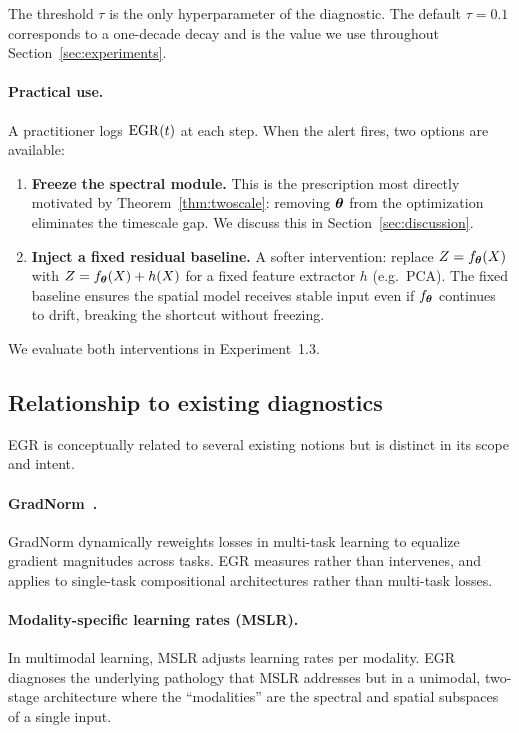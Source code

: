 \begin{remark}
The threshold $\tau$ is the only hyperparameter of the diagnostic.
The default $\tau = 0.1$ corresponds to a one-decade decay and is the
value we use throughout Section~\ref{sec:experiments}.
\end{remark}

\paragraph{Practical use.}
A practitioner logs $\mathrm{EGR}(t)$ at each step. When the alert fires,
two options are available:
\begin{enumerate}
    \item \textbf{Freeze the spectral module.} This is the prescription
          most directly motivated by Theorem~\ref{thm:twoscale}:
          removing ${\boldsymbol{\theta}}$ from the optimization eliminates the
          timescale gap. We discuss this in Section~\ref{sec:discussion}.
    \item \textbf{Inject a fixed residual baseline.} A softer
          intervention: replace $Z = f_{\boldsymbol{\theta}}(X)$ with
          $Z = f_{\boldsymbol{\theta}}(X) + h(X)$ for a fixed feature extractor
          $h$ (e.g.\ PCA). The fixed baseline ensures the spatial
          model receives stable input even if $f_{\boldsymbol{\theta}}$ continues
          to drift, breaking the shortcut without freezing.
\end{enumerate}
We evaluate both interventions in Experiment~1.3.

\subsection{Relationship to existing diagnostics}

EGR is conceptually related to several existing notions but is
distinct in its scope and intent.

\paragraph{GradNorm~\cite{chen2018gradnorm}.}
GradNorm dynamically reweights losses in multi-task learning to
equalize gradient magnitudes across tasks. EGR measures rather than
intervenes, and applies to single-task compositional architectures
rather than multi-task losses.

\paragraph{Modality-specific learning rates (MSLR).}
In multimodal learning, MSLR adjusts learning rates per modality. EGR
diagnoses the underlying pathology that MSLR addresses but in a
unimodal, two-stage architecture where the ``modalities'' are
the spectral and spatial subspaces of a single input.

